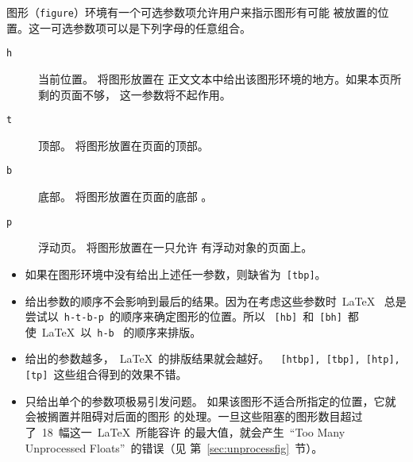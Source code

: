 图形（\texttt{figure}）环境有一个可选参数项允许用户来指示图形有可能
被放置的位置。这一可选参数项可以是下列字母的任意组合。
\begin{description}
	\item [\texttt{h}] { 当前位置。} 将图形放置在
	正文文本中给出该图形环境的地方。如果本页所剩的页面不够，
	这一参数将不起作用。
	\item [\texttt{t}] { 顶部。} 将图形放置在页面的顶部。
	\item [\texttt{b}] { 底部。} 将图形放置在页面的底部
	。
	\item [\texttt{p}] { 浮动页。} 将图形放置在一只允许
	有浮动对象的页面上。
\end{description}

\begin{itemize}
	\item 如果在图形环境中没有给出上述任一参数，则缺省为~\texttt{[tbp]}。
	\item 给出参数的顺序不会影响到最后的结果。因为在考虑这些参数时~\LaTeX{}~
	总是尝试以~\texttt{h-t-b-p}~的顺序来确定图形的位置。所以
	~\texttt{[hb]}~和~\texttt{[bh]}~都使~\LaTeX{}~以~\texttt{h-b}~
	的顺序来排版。
	\item 给出的参数越多，~\LaTeX{}~的排版结果就会越好。~\texttt{
		[htbp], [tbp], [htp], [tp]}~这些组合得到的效果不错。
	\item 只给出单个的参数项极易引发问题。
	如果该图形不适合所指定的位置，它就会被搁置并阻碍对后面的图形
	的处理。一旦这些阻塞的图形数目超过了~18~幅这一~\LaTeX{}~所能容许
	的最大值，就会产生~``Too Many Unprocessed Floats''~的错误（见
	第~\ref{sec:unprocessfig}~节）。
\end{itemize}

